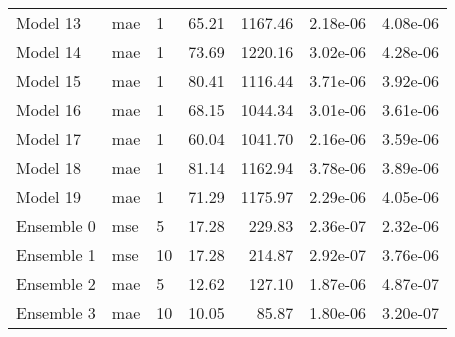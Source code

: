\begin{tabular}{lllrrrr}
Model 13   &               mae &         1 &           65.21 &                 1167.46 &          2.18e-06 &                  4.08e-06 \\
Model 14   &               mae &         1 &           73.69 &                 1220.16 &          3.02e-06 &                  4.28e-06 \\
Model 15   &               mae &         1 &           80.41 &                 1116.44 &          3.71e-06 &                  3.92e-06 \\
Model 16   &               mae &         1 &           68.15 &                 1044.34 &          3.01e-06 &                  3.61e-06 \\
Model 17   &               mae &         1 &           60.04 &                 1041.70 &          2.16e-06 &                  3.59e-06 \\
Model 18   &               mae &         1 &           81.14 &                 1162.94 &          3.78e-06 &                  3.89e-06 \\
Model 19   &               mae &         1 &           71.29 &                 1175.97 &          2.29e-06 &                  4.05e-06 \\
Ensemble 0 &               mse &         5 &           17.28 &                  229.83 &          2.36e-07 &                  2.32e-06 \\
Ensemble 1 &               mse &        10 &           17.28 &                  214.87 &          2.92e-07 &                  3.76e-06 \\
Ensemble 2 &               mae &         5 &           12.62 &                  127.10 &          1.87e-06 &                  4.87e-07 \\
Ensemble 3 &               mae &        10 &           10.05 &                   85.87 &          1.80e-06 &                  3.20e-07 \\
\bottomrule
\end{tabular}
